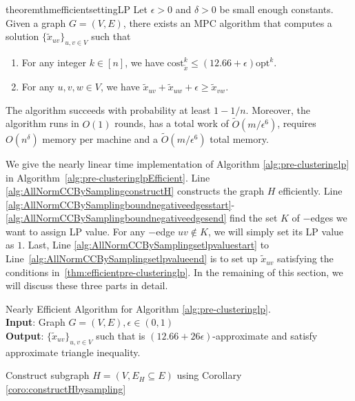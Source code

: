 \documentclass[11pt]{article}
\newcommand{\cost}{\mathrm{cost}}
\newcommand{\opt}{{\mathrm{opt}}}
\begin{document}
\begin{CJK*}{UTF8}{gbsn}
\begin{restatable}{theorem}{thmefficientsettingLP} \label{thm:efficientpre-clusteringlp}
Let $\epsilon> 0$ and $\delta > 0$ be small enough constants. Given a graph  $G = (V, E)$, there exists an MPC algorithm that computes a solution $\{ \tilde{x}_{uv} \}_{u,v \in V}$ such that 
\begin{enumerate}
    \item For any integer $k \in [n]$, we have $\cost^k_{\tilde{x}} \leq (12.66+ \epsilon) \opt^k$.
    \item  For any $u,v,w \in V$, we have $\tilde{x}_{uv} + \tilde{x}_{uw} + \epsilon \geq \tilde{x}_{vw}$. 
\end{enumerate}
The algorithm succeeds with probability at least $1 - 1/n$. Moreover,  the algorithm runs in $O(1)$ rounds, has a total work of $\tilde{O}(m / \epsilon^6)$, requires $O(n^\delta)$ memory per machine and a $\tilde{O}(m / \epsilon^6)$ total memory. 
\end{restatable}






We give the nearly linear time implementation of Algorithm \ref{alg:pre-clusteringlp} in Algorithm~\ref{alg:pre-clusteringlpEfficient}. Line \ref{alg:AllNormCCBySamplingconstructH} constructs the graph $H$ efficiently. Line \ref{alg:AllNormCCBySamplingboundnegativeedgesstart}-\ref{alg:AllNormCCBySamplingboundnegativeedgesend} find the set $K$ of $-$edges we want to assign LP value. For any $-$edge $uv \not\in K$, we will simply set its LP value as $1$. Last, Line \ref{alg:AllNormCCBySamplingsetlpvaluestart} to Line~\ref{alg:AllNormCCBySamplingsetlpvalueend} is to set up $\tilde{x}_{uv}$ satisfying the conditions in~\ref{thm:efficientpre-clusteringlp}. In the remaining of this section, we will discuss these three parts in detail.

\begin{algorithm}[ht!]
\caption{Nearly Efficient Algorithm for Algorithm \ref{alg:pre-clusteringlp}.\\
\textbf{Input}: Graph $G = (V, E), \epsilon\in (0, 1)$\\
\textbf{Output}: $\{ \tilde{x}_{uv} \}_{u,v \in V}$ such that is $(12.66 + 26\epsilon)$-approximate and satisfy approximate triangle inequality. }
\label{alg:pre-clusteringlpEfficient}
\begin{algorithmic}[1]
    \State Construct subgraph $H = (V, E_H \subseteq E)$ using Corollary \ref{coro:constructHbysampling} 
    \label{alg:AllNormCCBySamplingconstructH} \medskip



\end{algorithmic}
\end{algorithm}
\end{CJK*}
\end{document}
